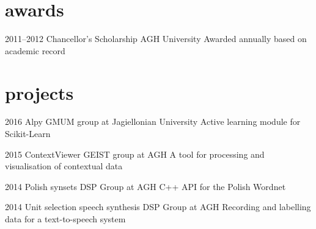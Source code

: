 \documentclass[]{friggeri-cv_osx}
\begin{document}
\section{awards}
\begin{entrylist}
\entry
{2011--2012}
{Chancellor's Scholarship}
{AGH University}
{Awarded annually based on academic record}
\end{entrylist}


\section{projects}
\begin{entrylist}
\entry
{2016}
{Alpy}
{GMUM group at Jagiellonian University}
{Active learning module for Scikit-Learn}

\entry
{2015}
{ContextViewer}
{GEIST group at AGH}
{A tool for processing and visualisation of contextual data}

\entry
{2014}
{Polish synsets}
{DSP Group at AGH}
{C++ API for the Polish Wordnet}

\entry
{2014}
{Unit selection speech synthesis}
{DSP Group at AGH}
{Recording and labelling data for a text-to-speech system}
\end{entrylist}
\end{document}
